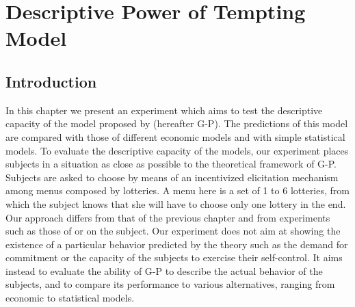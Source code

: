 \documentclass[
]{book}
\begin{document}
\hypertarget{tempting-lab}{%
\chapter{Descriptive Power of Tempting Model}\label{tempting-lab}}

\hypertarget{intro3}{%
\section{Introduction}\label{intro3}}

In this chapter we present an experiment which aims to test the descriptive
capacity of the model proposed by \citet{gul2001temptation} (hereafter G-P).
The predictions of this model are compared with those of different economic
models and with simple statistical models.
To evaluate the descriptive capacity of the models, our experiment places
subjects in a situation as close as possible to the theoretical framework of
G-P.
Subjects are asked to choose by means of an incentivized elicitation mechanism
among menus composed by lotteries.
A menu here is a set of 1 to 6 lotteries, from which the subject knows that she will have to
choose only one lottery in the end.
Our approach differs from that of the previous chapter and from experiments such
as those of \citet{houser2018temptation} or \citet{toussaert2018eliciting} on the subject.
Our experiment does not aim at showing the existence of a particular behavior
predicted by the theory such as the demand for commitment or the capacity of the
subjects to exercise their self-control.
It aims instead to evaluate the
ability of G-P to describe the actual behavior of the subjects,
and to compare its performance to various alternatives, ranging from economic to
statistical models.
\end{document}
